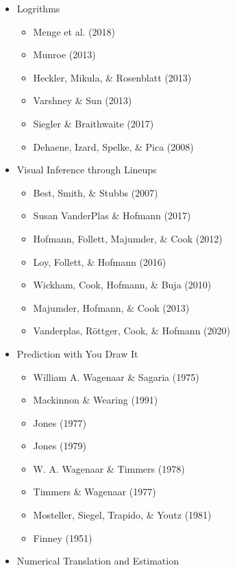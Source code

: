 \documentclass[print]{nuthesis}
\providecommand{\tightlist}{%
  \setlength{\itemsep}{0pt}\setlength{\parskip}{0pt}}
\begin{document}
\begin{itemize}
\tightlist
\item
  Logrithms

  \begin{itemize}
  \tightlist
  \item
    Menge et al. (2018)
  \item
    Munroe (2013)
  \item
    Heckler, Mikula, \& Rosenblatt (2013)
  \item
    Varshney \& Sun (2013)
  \item
    Siegler \& Braithwaite (2017)
  \item
    Dehaene, Izard, Spelke, \& Pica (2008)
  \end{itemize}
\item
  Visual Inference through Lineups

  \begin{itemize}
  \tightlist
  \item
    Best, Smith, \& Stubbs (2007)
  \item
    Susan VanderPlas \& Hofmann (2017)
  \item
    Hofmann, Follett, Majumder, \& Cook (2012)
  \item
    Loy, Follett, \& Hofmann (2016)
  \item
    Wickham, Cook, Hofmann, \& Buja (2010)
  \item
    Majumder, Hofmann, \& Cook (2013)
  \item
    Vanderplas, Röttger, Cook, \& Hofmann (2020)
  \end{itemize}
\item
  Prediction with You Draw It

  \begin{itemize}
  \tightlist
  \item
    William A. Wagenaar \& Sagaria (1975)
  \item
    Mackinnon \& Wearing (1991)
  \item
    Jones (1977)
  \item
    Jones (1979)
  \item
    W. A. Wagenaar \& Timmers (1978)
  \item
    Timmers \& Wagenaar (1977)
  \item
    Mosteller, Siegel, Trapido, \& Youtz (1981)
  \item
    Finney (1951)
  \end{itemize}
\item
  Numerical Translation and Estimation
\end{itemize}
\end{document}
